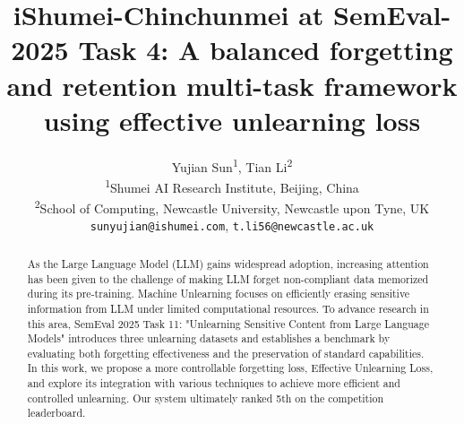 \documentclass[11pt]{article}
\title{iShumei-Chinchunmei at SemEval-2025 Task 4: A balanced forgetting and retention multi-task framework using effective unlearning loss}
\author{
  Yujian Sun\textsuperscript{1},
  Tian Li\textsuperscript{2}
\\
  \textsuperscript{1}Shumei AI Research Institute, Beijing, China\\
  \textsuperscript{2}School of Computing, Newcastle University, Newcastle upon Tyne, UK
\\
  \texttt{sunyujian@ishumei.com},
  \texttt{t.li56@newcastle.ac.uk}
}
\begin{document}
\maketitle
\begin{abstract}




As the Large Language Model (LLM) gains widespread adoption, increasing attention has been given to the challenge of making LLM forget non-compliant data memorized during its pre-training. Machine Unlearning focuses on efficiently erasing sensitive information from LLM under limited computational resources. To advance research in this area, SemEval 2025 Task 11: "Unlearning Sensitive Content from Large Language Models" introduces three unlearning datasets and establishes a benchmark by evaluating both forgetting effectiveness and the preservation of standard capabilities. In this work, we propose a more controllable forgetting loss, Effective Unlearning Loss, and explore its integration with various techniques to achieve more efficient and controlled unlearning. Our system ultimately ranked 5th on the competition leaderboard.

\end{abstract}
\end{document}
